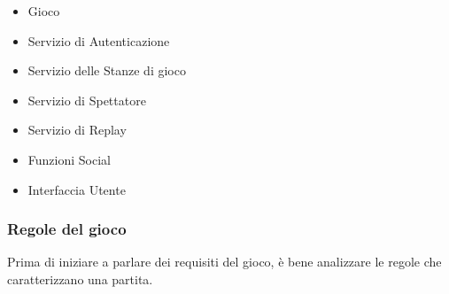              \begin {itemize}
             \item Gioco
             \item Servizio di Autenticazione
             \item Servizio delle Stanze di gioco
             \item Servizio di Spettatore
             \item Servizio di Replay
             \item Funzioni Social
             \item Interfaccia Utente
             \end {itemize}
             
            \subsubsection[Gioco]{\large {Regole del gioco}\label{subsub:requirements:game}}
            Prima di iniziare a parlare dei requisiti del gioco, è bene analizzare le regole che caratterizzano una partita. 
            

